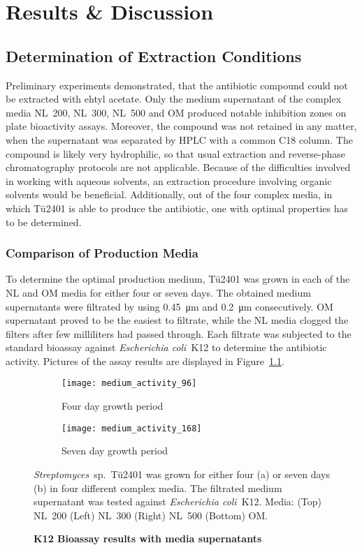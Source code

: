 \chapter{Results \& Discussion}

\section{Determination of Extraction Conditions} %
\label{sec:determination_of_extraction_conditions}

Preliminary experiments demonstrated, that the antibiotic compound could not be extracted with ehtyl acetate. Only the medium supernatant of the complex media NL~200, NL~300, NL~500 and OM produced notable inhibition zones on plate bioactivity assays. Moreover, the compound was not retained in any matter, when the supernatant was separated by HPLC with a common C18 column. The compound is likely very hydrophilic, so that usual extraction and reverse-phase chromatography protocols are not applicable. Because of the difficulties involved in working with aqueous solvents, an extraction procedure involving organic solvents would be beneficial. Additionally, out of the four complex media, in which Tü2401 is able to produce the antibiotic, one with optimal properties has to be determined.

\subsection{Comparison of Production Media} %
\label{sub:comparison_of_production_media}

	To determine the optimal production medium, Tü2401 was grown in each of the NL and OM media for either four or seven days. The obtained medium supernatants were filtrated by using \SI{0.45}{\micro\meter} and \SI{0.2}{\micro\meter} consecutively. OM supernatant proved to be the easiest to filtrate, while the NL media clogged the filters after few milliliters had passed through. Each filtrate was subjected to the standard bioassay against \textit{Escherichia coli}~K12 to determine the antibiotic activity. Pictures of the assay results are displayed in Figure~\ref{fig:medium_activity}.
	
	\begin{figure}[htbp]
	\centering
		\begin{subfigure}{0.5\textwidth}
			\texttt{[image: medium\_activity\_96]}
			\caption{Four day growth period}
		\end{subfigure}%
		\begin{subfigure}{0.5\textwidth}
			\texttt{[image: medium\_activity\_168]}
			\caption{Seven day growth period}
		\end{subfigure}
		\caption[K12 Bioassay results with media supernatants]{\textbf{K12 Bioassay results with media supernatants}} \textit{Streptomyces}~sp.~Tü2401 was grown for either four (a) or seven days (b) in four different complex media. The filtrated medium supernatant was tested against \textit{Escherichia coli}~K12. Media: (Top) NL~200 (Left) NL~300 (Right) NL~500 (Bottom) OM.
		\label{fig:medium_activity}
	\end{figure}
	
